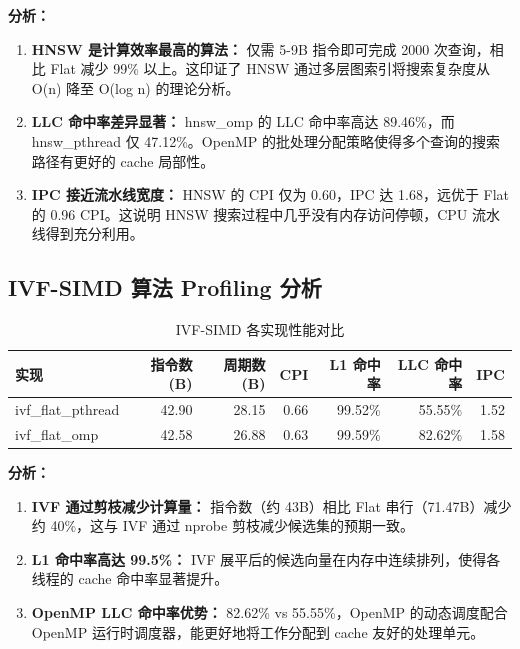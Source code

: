 \documentclass[a4paper]{article}
\begin{document}
\textbf{分析：}

\begin{enumerate}
\item \textbf{HNSW 是计算效率最高的算法：} 仅需 5-9B 指令即可完成 2000 次查询，相比 Flat 减少 99\% 以上。这印证了 HNSW 通过多层图索引将搜索复杂度从 O(n) 降至 O(log n) 的理论分析。

\item \textbf{LLC 命中率差异显著：} hnsw\_omp 的 LLC 命中率高达 89.46\%，而 hnsw\_pthread 仅 47.12\%。OpenMP 的批处理分配策略使得多个查询的搜索路径有更好的 cache 局部性。

\item \textbf{IPC 接近流水线宽度：} HNSW 的 CPI 仅为 0.60，IPC 达 1.68，远优于 Flat 的 0.96 CPI。这说明 HNSW 搜索过程中几乎没有内存访问停顿，CPU 流水线得到充分利用。
\end{enumerate}

\subsection{IVF-SIMD 算法 Profiling 分析}

\begin{table}[htbp]
\centering
\caption{IVF-SIMD 各实现性能对比}
\begin{tabular}{lrrrrrr}
\toprule
实现 & 指令数 (B) & 周期数 (B) & CPI & L1 命中率 & LLC 命中率 & IPC \\
\midrule
ivf\_flat\_pthread & 42.90 & 28.15 & 0.66 & 99.52\% & 55.55\% & 1.52 \\
ivf\_flat\_omp     & 42.58 & 26.88 & 0.63 & 99.59\% & 82.62\% & 1.58 \\
\bottomrule
\end{tabular}
\end{table}

\textbf{分析：}

\begin{enumerate}
\item \textbf{IVF 通过剪枝减少计算量：} 指令数（约 43B）相比 Flat 串行（71.47B）减少约 40\%，这与 IVF 通过 nprobe 剪枝减少候选集的预期一致。

\item \textbf{L1 命中率高达 99.5\%：} IVF 展平后的候选向量在内存中连续排列，使得各线程的 cache 命中率显著提升。

\item \textbf{OpenMP LLC 命中率优势：} 82.62\% vs 55.55\%，OpenMP 的动态调度配合 OpenMP 运行时调度器，能更好地将工作分配到 cache 友好的处理单元。
\end{enumerate}
\end{document}

